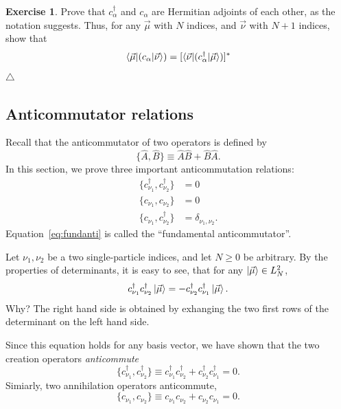 \documentclass{report}
\theoremstyle{plain}
\theoremstyle{definition}
\newtheorem{exerc}{Exercise}[chapter]
\newcommand\xqed[1]{%
  \leavevmode\unskip\penalty9999 \hbox{}\nobreak\hfill
  \quad\hbox{#1}}
\newcommand\demo{\xqed{$\triangle$}}
\newenvironment{exercise}{\bigskip\begin{exerc}}{\demo\end{exerc}\bigskip}
\begin{document}
\begin{exercise}
  Prove that $c^\dag_\alpha$ and $c_\alpha$ are Hermitian adjoints of each
  other, as the notation suggests. Thus, for any $\vec{\mu}$ with $N$
  indices, and $\vec{\nu}$ with $N+1$ indices, show that
  \begin{equation}
    \braket{\vec{\mu}|(c_\alpha|\vec{\nu}}) =
    [\braket{\vec{\nu}|(c^\dag_\alpha|\vec{\mu}})]^*
  \end{equation}
\end{exercise}

\subsection{Anticommutator relations}

Recall that the anticommutator of two operators is defined by
\begin{equation}
  \{ \hat{A}, \hat{B} \} \equiv \hat{A}\hat{B} + \hat{B}\hat{A}.
\end{equation}
In this section, we prove three important anticommutation relations:
\begin{subequations}
  \label{eq:anticommutator-relations}
\begin{align}
  \{ c^\dag_{\nu_1}, c^\dag_{\nu_2} \} & = 0 \\
  \{ c_{\nu_1}, c_{\nu_2} \} & = 0 \\
  \{ c_{\nu_1}, c^\dag_{\nu_2} \} & = \delta_{\nu_1,\nu_2}. \label{eq:fundanti}
\end{align}
\end{subequations}
Equation~\eqref{eq:fundanti} is called the ``fundamental anticommutator''.

Let $\nu_1,\nu_2$ be a two single-particle indices, and let $N\geq 0$ be arbitrary.
By the properties of determinants, it is easy to see, that for any
$\ket{\vec{\mu}} \in L^2_N$,
\begin{equation}
  c^\dag_{\nu_1} c^\dag_{\nu_2} \ket{\vec{\mu}} = -c^\dag_{\nu_2}
  c^\dag_{\nu_1} \ket{\vec{\mu}}.
\end{equation}
Why? The right hand side is obtained by exhanging the two first rows
of the determinant on the left hand side.

Since this equation holds for any basis vector, we have shown that the
two creation operators \emph{anticommute}
\begin{equation}
  \{ c^\dag_{\nu_1}, c^\dag_{\nu_2} \} \equiv c^\dag_{\nu_1}
  c^\dag_{\nu_2} + c^\dag_{\nu_2} c^\dag_{\nu_1} = 0.
\end{equation}
Simiarly, two annihilation operators anticommute,
\begin{equation}
  \{ c_{\nu_1}, c_{\nu_2} \} \equiv c_{\nu_1}
  c_{\nu_2} + c_{\nu_2} c_{\nu_1} = 0.
\end{equation}
\end{document}
